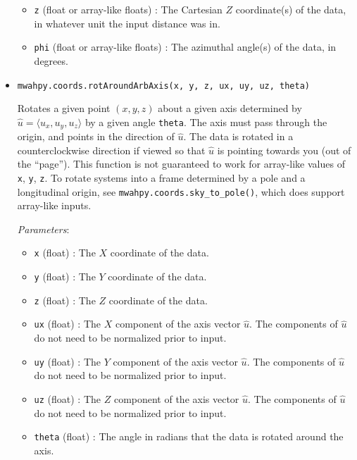 \documentclass{article}
\begin{document}
\begin{itemize}
\begin{itemize}
\item \verb!z! (float or array-like floats) : The Cartesian $Z$ coordinate(s) of the data, in whatever unit the input distance was in.

\item \verb!phi! (float or array-like floats) : The azimuthal angle(s) of the data, in degrees.

\end{itemize}



\item \verb!mwahpy.coords.rotAroundArbAxis(x, y, z, ux, uy, uz, theta)!

Rotates a given point $(x,y,z)$ about a given axis determined by  $\hat{u} = \langle u_x, u_y, u_z \rangle$ by a given angle \verb!theta!. The axis must pass through the origin, and points in the direction of $\hat{u}$. The data is rotated in a counterclockwise direction if viewed so that $\hat{u}$ is pointing towards you (out of the ``page''). This function is not guaranteed to work for array-like values of \verb!x!, \verb!y!, \verb!z!. To rotate systems into a frame determined by a pole and a longitudinal origin, see \verb!mwahpy.coords.sky_to_pole()!, which does support array-like inputs.

\textit{Parameters}: \begin{itemize}

\item \verb!x! (float) : The $X$ coordinate of the data.

\item \verb!y! (float) : The $Y$ coordinate of the data.

\item \verb!z! (float) : The $Z$ coordinate of the data.

\item \verb!ux! (float) : The $X$ component of the axis vector $\hat{u}$. The components of $\hat{u}$ do not need to be normalized prior to input.

\item \verb!uy! (float) : The $Y$ component of the axis vector $\hat{u}$. The components of $\hat{u}$ do not need to be normalized prior to input.

\item \verb!uz! (float) : The $Z$ component of the axis vector $\hat{u}$. The components of $\hat{u}$ do not need to be normalized prior to input.

\item \verb!theta! (float) : The angle in radians that the data is rotated around the axis. 


\end{itemize}
\end{itemize}
\end{document}
